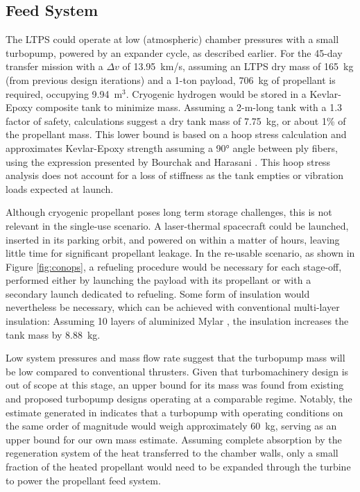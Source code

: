 \documentclass[final,3p,times,twocolumn,sort&compress, lefttitle]{elsarticle}
\begin{document}
        \subsection{Feed System}
            The LTPS could operate at low (atmospheric) chamber pressures with a small turbopump, powered by an expander cycle, as described earlier. For the 45-day transfer mission with a $\Delta v$ of 13.95~km/s, assuming an LTPS dry mass of 165~kg (from previous design iterations) and a 1-ton payload, 706~kg of propellant is required, occupying 9.94~m$^3$. Cryogenic hydrogen would be stored in a Kevlar-Epoxy composite tank to minimize mass. Assuming a 2-m-long tank with a 1.3 factor of safety, calculations suggest a dry tank mass of 7.75~kg, or about 1\% of the propellant mass. This lower bound is based on a hoop stress calculation and approximates Kevlar-Epoxy strength assuming a 90° angle between ply fibers, using the expression presented by Bourchak and Harasani \cite{bourchak_analytical_2015}. This hoop stress analysis does not account for a loss of stiffness as the tank empties or vibration loads expected at launch. 
    
            Although cryogenic propellant poses long term storage challenges, this is not relevant in the single-use scenario. A laser-thermal spacecraft could be launched, inserted in its parking orbit, and powered on within a matter of hours, leaving little time for significant propellant leakage. In the re-usable scenario, as shown in Figure \ref{fig:conops}, a refueling procedure would be necessary for each stage-off, performed either by launching the payload with its propellant or with a secondary launch dedicated to refueling. Some form of insulation would nevertheless be necessary, which can be achieved with conventional multi-layer insulation: Assuming 10 layers of aluminized Mylar \cite{institut_fur_arbeitsschutz_der_deutschen_gesetzlichen_unfallversicherung_ifa_polyethylene_nodate}, the insulation increases the tank mass by 8.88~kg.
            
            Low system pressures and mass flow rate suggest that the turbopump mass will be low compared to conventional thrusters. Given that turbomachinery design is out of scope at this stage, an upper bound for its mass was found from existing and proposed turbopump designs operating at a comparable regime. Notably, the estimate generated in \cite{chen_turbopump_2006} indicates that a turbopump with operating conditions on the same order of magnitude would weigh approximately 60~kg, serving as an upper bound for our own mass estimate. Assuming complete absorption by the regeneration system of the heat transferred to the chamber walls, only a small fraction of the heated propellant would need to be expanded through the turbine to power the propellant feed system.
        
\end{document}
